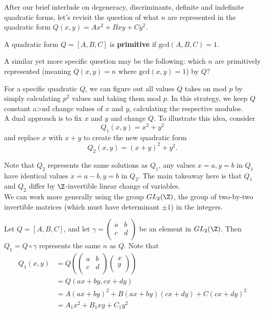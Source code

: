 \documentclass[11pt]{article}
\begin{document}
After our brief interlude on degeneracy, discriminants, definite and indefinite quadratic forms, let's revisit the question of 
what $n$ are represented in the quadratic form $Q(x, y) = Ax^2 + Bxy + Cy^2$. \\

\begin{definition}
A quadratic form $Q = [A, B, C]$ is \textbf{primitive} if $\mathrm{gcd}(A, B, C) = 1$. 
\end{definition}
A similar yet more specific question may be the following: which $n$ are primitively represented (meaning $Q(x, y) = n$ where $\mathrm{gcd}(x, y) = 1$) by $Q$? \\

\begin{answer}
For a specific quadratic $Q$, we can figure out all values $Q$ takes on mod $p$ by simply calculating $p^2$ values and taking them mod $p$.
In this strategy, we keep $Q$ constant a>nd change values of $x$ and $y$, calculating the respective modulos. \\

A dual approach is to fix $x$ and $y$ and change $Q$. To illustrate this idea, consider
\[
    Q_1(x, y) = x^2 + y^2
\]
and replace $x$ with $x+y$ to create the new quadratic form
\[
    Q_2(x, y) = (x+y)^2 + y^2.
\]

Note that $Q_2$ represents the same solutions as $Q_1$, any values $x = a, y = b$ in $Q_1$ have identical values $x = a - b, y = b$ in $Q_2$.
The main takeaway here is that $Q_1$ and $Q_2$ differ by $\Z$-invertible linear change of variables. \\

We can work more generally using the group $GL_2(\Z)$, the group of two-by-two invertible matrices (which must have determinant $\pm 1$) in the integers. \end{answer}

Let $Q = [A, B, C]$, and let 
$\gamma = \begin{pmatrix}
    a & b \\
    c & d \\
\end{pmatrix}$
be an element in $GL_2(\Z)$. Then $Q_1 = Q \circ \gamma$ represents the same $n$ as $Q$. Note that
\begin{align*}
    Q_1(x, y) &= 
    Q\left( \begin{pmatrix}
        a & b \\
        c & d \\
    \end{pmatrix} 
    \begin{pmatrix}
        x \\
        y\\
    \end{pmatrix}
    \right) \\
    &= Q(ax + by, cx + dy) \\
    &= A(ax+by)^2 + B(ax+by)(cx+dy) + C(cx+dy)^2 \\
    &= A_1 x^2 + B_1 xy + C_1 y^2
\end{align*}
\end{document}
